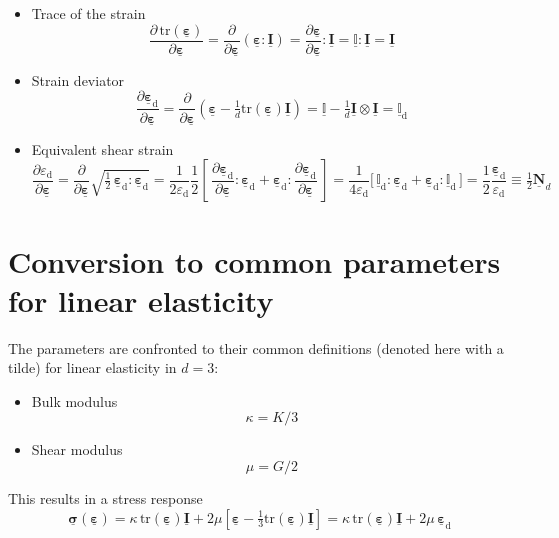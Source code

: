 \documentclass[times,namecite]{goose-article}
\newcommand\T[1]{\underline{\bm{{#1}}}}
\newcommand\TT[1]{\underline{\mathbb{{#1}}}}
\begin{document}
\begin{itemize}
%
\item Trace of the strain
\begin{equation}
  \frac{ \partial \, \mathrm{tr} ( \T{\varepsilon} ) }{ \partial \T{\varepsilon} }
  =
  \frac{ \partial }{ \partial \T{\varepsilon} } \left( \T{\varepsilon} : \T{I} \right)
  =
  \frac{ \partial \T{\varepsilon} }{ \partial \T{\varepsilon} } : \T{I}
  =
  \TT{I} : \T{I}
  =
  \T{I}
\end{equation}
%
\item Strain deviator
\begin{equation}
  \frac{\partial \T{\varepsilon}_\mathrm{d}}{\partial \T{\varepsilon}}
  =
  \frac{ \partial }{ \partial \T{\varepsilon} } \left( \T{\varepsilon} - \tfrac{1}{d} \mathrm{tr} ( \T{\varepsilon} ) \T{I} \right)
  =
  \TT{I} - \tfrac{1}{d} \T{I} \otimes \T{I}
  =
  \TT{I}_\mathrm{d}
\end{equation}
%
\item Equivalent shear strain
\begin{equation}
  \frac{ \partial \varepsilon_\mathrm{d} }{ \partial \T{\varepsilon} }
  =
  \frac{\partial}{\partial \T{\varepsilon}} \sqrt{\tfrac{1}{2}\, \T{\varepsilon}_\mathrm{d} : \T{\varepsilon}_\mathrm{d}}
  =
  \frac{1}{2 \varepsilon_\mathrm{d}}
  \frac{1}{2}
  \left[\, \frac{\partial \T{\varepsilon}_\mathrm{d}}{\partial \T{\varepsilon}} : \T{\varepsilon}_\mathrm{d} + \T{\varepsilon}_\mathrm{d} : \frac{\partial \T{\varepsilon}_\mathrm{d}}{\partial \T{\varepsilon}} \,\right]
  =
  \frac{1}{4 \varepsilon_\mathrm{d}}
  \big[\, \TT{I}_\mathrm{d} : \T{\varepsilon}_\mathrm{d} + \T{\varepsilon}_\mathrm{d} : \TT{I}_\mathrm{d} \,\big]
  =
  \frac{1}{2}
  \frac{\T{\varepsilon}_\mathrm{d}}{\varepsilon_\mathrm{d}}
  \equiv
  \tfrac{1}{2}
  \T{N}_d
\end{equation}
%
\end{itemize}

\section{Conversion to common parameters for linear elasticity}

The parameters are confronted to their common definitions (denoted here with a tilde) for linear elasticity in $d = 3$:

\begin{itemize}
  \item Bulk modulus
  \begin{equation}
    \kappa = K / 3
  \end{equation}
  \item Shear modulus
  \begin{equation}
    \mu = G / 2
  \end{equation}
\end{itemize}
This results in a stress response
\begin{equation}
  \T{\sigma} ( \T{\varepsilon} )
  =
  \kappa \, \mathrm{tr} ( \T{\varepsilon} ) \T{I}
  +
  2 \mu \left[ \T{\varepsilon} - \tfrac{1}{3} \mathrm{tr} ( \T{\varepsilon} ) \T{I} \right]
  =
  \kappa \, \mathrm{tr} ( \T{\varepsilon} ) \T{I}
  +
  2 \mu \, \T{\varepsilon}_\mathrm{d}
\end{equation}


\end{document}
